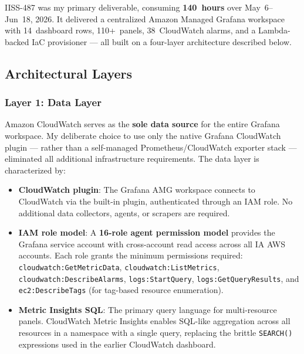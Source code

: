 IISS-487 was my primary deliverable, consuming
\textbf{140~hours} over May~6--Jun~18, 2026. It delivered a centralized
Amazon Managed Grafana workspace with 14~dashboard rows, 110+~panels,
38~CloudWatch alarms, and a Lambda-backed IaC provisioner --- all built
on a four-layer architecture described below.

\subsection{Architectural Layers}

\subsubsection{Layer 1: Data Layer}

Amazon CloudWatch serves as the \textbf{sole data source} for the entire
Grafana workspace. My deliberate choice to use only the native Grafana
CloudWatch plugin --- rather than a self-managed Prometheus/CloudWatch
exporter stack --- eliminated all additional infrastructure requirements.
The data layer is characterized by:

\begin{itemize}
    \item \textbf{CloudWatch plugin}: The Grafana AMG workspace connects
          to CloudWatch via the built-in plugin, authenticated through an
          IAM role. No additional data collectors, agents, or scrapers
          are required.

    \item \textbf{IAM role model}: A \textbf{16-role agent permission
          model} provides the Grafana service account with cross-account
          read access across all IA AWS accounts. Each role grants the
          minimum permissions required: \texttt{cloudwatch:GetMetricData},
          \texttt{cloudwatch:ListMetrics}, \texttt{cloudwatch:DescribeAlarms},
          \texttt{logs:StartQuery}, \texttt{logs:GetQueryResults}, and
          \texttt{ec2:DescribeTags} (for tag-based resource enumeration).

    \item \textbf{Metric Insights SQL}: The primary query language for
          multi-resource panels. CloudWatch Metric Insights enables
          SQL-like aggregation across all resources in a namespace with
          a single query, replacing the brittle \texttt{SEARCH()} expressions
          used in the earlier CloudWatch dashboard.
\end{itemize}

